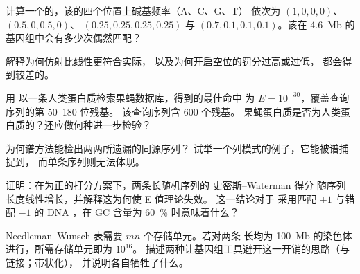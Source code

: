\begin{exercise}[$\star\star$]\label{exo:b3:bioinformatics:6}
计算一个的，该的四个位置上碱基频率（A、C、G、T）
依次为 $(1,0,0,0)$、$(0.5,0,0.5,0)$、
$(0.25,0.25,0.25,0.25)$ 与 $(0.7,0.1,0.1,0.1)$。该在
\qty{4.6}{Mb} 的基因组中会有多少次偶然匹配？
\end{exercise}

\begin{exercise}[$\star\star$]\label{exo:b3:bioinformatics:7}
解释为何仿射比线性更符合实际，
以及为何开启空位的罚分过高或过低，
都会得到较差的。
\end{exercise}

\begin{exercise}[$\star\star$]\label{exo:b3:bioinformatics:8}
用  以一条人类蛋白质检索果蝇数据库，得到的最佳命中
为 $E = 10^{-30}$，覆盖查询序列的第 50--180 位残基。
该查询序列含 \num{600} 个残基。
果蝇蛋白质是否为人类蛋白质的？还应做何种进一步检验？
\end{exercise}

\begin{exercise}[$\star\star$]\label{exo:b3:bioinformatics:9}
为何谱方法能检出两两所遗漏的同源序列？
试举一个列模式的例子，它能被谱捕捉到，
而单条序列则无法体现。
\end{exercise}

\begin{exercise}[$\star\star\star$]\label{exo:b3:bioinformatics:10}
证明：在为正的打分方案下，两条长随机序列的
史密斯--Waterman 得分
随序列长度线性增长，并解释这为何使 E 值理论失效。
这一结论对于
采用匹配 $+1$ 与错配 $-1$ 的 DNA ，在 GC 含量为 \qty{60}{\%} 时意味着什么？
\end{exercise}

\begin{exercise}[$\star\star\star$]\label{exo:b3:bioinformatics:11}
Needleman--Wunsch 表需要 $mn$ 个存储单元。若对两条
长均为 \qty{100}{Mb} 的染色体进行，所需存储单元即为 $10^{16}$。
描述两种让基因组工具避开这一开销的思路（与链接；带状化），
并说明各自牺牲了什么。
\end{exercise}

